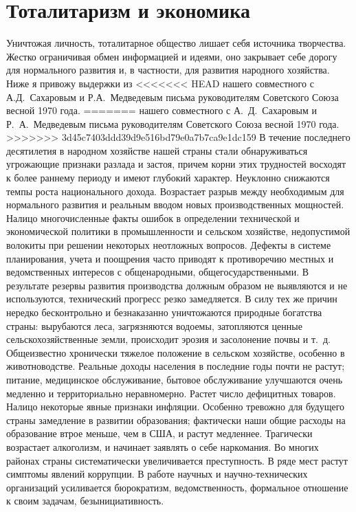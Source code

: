 \documentclass{book}
\begin{document}
\section{Тоталитаризм и экономика}

Уничтожая личность, тоталитарное общество лишает себя источника творчества. Жестко ограничивая обмен информацией и идеями, оно 
закрывает себе дорогу для нормального раз­вития и, в частности, для развития народного хозяйства. Ниже я привожу выдержки из 
<<<<<<< HEAD
нашего совместного с А.Д.~Сахаровым и Р.А.~Медведевым письма руководителям Советского Союза весной 1970 года.
=======
нашего совместного с А.~Д.~Сахаровым и Р.~А.~Медведевым письма руководителям Советского Союза весной 1970 года.
>>>>>>> 3d45c7403ddd39d9e516bd79e0a7b7ca9e1dc159
В течение последнего десятилетия в народном хозяйстве нашей страны стали обнаруживаться угрожающие признаки разлада и застоя, 
причем корни этих трудностей восходят к более раннему периоду и имеют глубокий характер. Неуклонно снижаются темпы роста 
национального дохода. Возрастает разрыв между необходимым для нормального развития и реаль­ным вводом новых производственных 
мощностей. Налицо многочисленные факты ошибок в определении технической и экономической политики в промышленности и сельском 
хозяйстве, недопустимой волокиты при решении некоторых неотложных вопросов. Дефекты в системе планирования, учета и поощрения 
часто приводят к противоречию местных и ведомственных интересов с общенародными, общегосударственными. В результате резервы 
развития производства должным образом не выявляются и не используются, технический прогресс резко замедляется. В силу тех же 
причин нередко бесконтрольно и безнаказанно уничтожаются природные богатства страны: вырубаются леса, загрязняются водоемы, 
затопляются ценные сельскохозяйственные земли, происходит эрозия и засолонение почвы и т.~д. Общеизвестно хронически тяжелое 
положение в сельском хозяйстве, особенно в животноводстве. Реальные до­ходы населения в последние годы почти не растут; питание, 
медицинское обслуживание, бытовое обслуживание улучшаются очень медленно и территориально неравномерно. Растет чис­ло дефицитных 
товаров. Налицо некоторые явные признаки инфляции. Особенно тревожно для будущего страны замедление в развитии образования; 
фактически наши общие расходы на образование втрое меньше, чем в США, и растут медленнее. Трагически возрастает алкоголизм, и 
начинает заявлять о себе наркомания. Во многих районах страны систематически увеличивается преступность. В ряде мест растут 
симптомы явлений коррупции. В работе научных и научно-технических организаций усиливается бюрократизм, ведомственность, 
формальное отношение к своим задачам, безынициативность.
\end{document}
